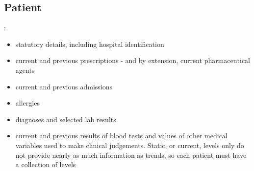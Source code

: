 \documentclass[letterpaper]{amsart}
\begin{document}
\paragraph{}
\subsection{Patient}:
\begin{itemize}
    \item statutory details, including hospital identification
    \item current and previous prescriptions - and by extension, current pharmaceutical agents
    \item current and previous admissions
    \item allergies
    \item diagnoses and selected lab results 
    \item current and previous results of blood tests and values of other medical variables used to make clinical judgements.  Static, or current, levels only do not provide nearly as much information as trends, so each patient must have a collection of levels
\end{itemize}
\end{document}
